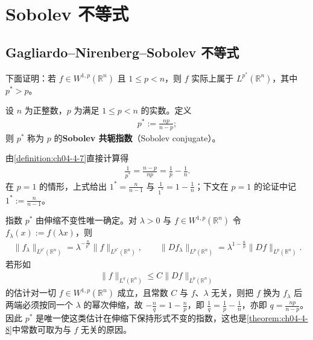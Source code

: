 \documentclass[../../main.tex]{subfiles}%
\begin{document}
\section{Sobolev 不等式}\label{section:ch04-05}

\subsection{Gagliardo--Nirenberg--Sobolev 不等式}\label{subsection:ch04-05-1}

下面证明：若 $f\in W^{1,p}(\mathbb{R}^n)$ 且 $1\leqslant p<n$，则 $f$ 实际上属于 $L^{p^*}(\mathbb{R}^n)$，其中 $p^*>p$。

\begin{definition}\label{definition:ch04-4-7}
设 $n$ 为正整数，$p$ 为满足 $1\leqslant p<n$ 的实数。定义
\begin{align*}
p^*:=\frac{np}{n-p};
\end{align*}
则 $p^*$ 称为 $p$ 的\textbf{Sobolev 共轭指数}（Sobolev conjugate）。
\end{definition}

\begin{remark}\label{remark:ch04-def-4-7-倒数}
由\cref{definition:ch04-4-7}直接计算得%
\begin{align*}
\frac{1}{p^*}=\frac{n-p}{np}=\frac{1}{p}-\frac{1}{n}.
\end{align*}
在 $p=1$ 的情形，上式给出 $1^*=\frac{n}{n-1}$ 与 $\frac{1}{1^*}=1-\frac{1}{n}$；下文在 $p=1$ 的论证中记 $1^*:=\frac{n}{n-1}$。
\end{remark}

\begin{remark}\label{remark:ch04-def-4-7-动机}
指数 $p^*$ 由伸缩不变性唯一确定。对 $\lambda>0$ 与 $f\in W^{1,p}(\mathbb{R}^n)$ 令 $f_\lambda(x):=f(\lambda x)$，则
\begin{align*}
\lVert f_\lambda\rVert_{L^{p^*}(\mathbb{R}^n)}=\lambda^{-\frac{n}{p^*}}\lVert f\rVert_{L^{p^*}(\mathbb{R}^n)},\qquad
\lVert Df_\lambda\rVert_{L^p(\mathbb{R}^n)}=\lambda^{1-\frac{n}{p}}\lVert Df\rVert_{L^p(\mathbb{R}^n)} .
\end{align*}
若形如
\begin{align*}
\lVert f\rVert_{L^{q}(\mathbb{R}^n)}\leqslant C\lVert Df\rVert_{L^p(\mathbb{R}^n)}
\end{align*}
的估计对一切 $f\in W^{1,p}(\mathbb{R}^n)$ 成立，且常数 $C$ 与 $f$、$\lambda$ 无关，则把 $f$ 换为 $f_\lambda$ 后两端必须按同一个 $\lambda$ 的幂次伸缩，故 $-\frac{n}{q}=1-\frac{n}{p}$，即 $\frac{1}{q}=\frac{1}{p}-\frac{1}{n}$，亦即 $q=\frac{np}{n-p}$。因此 $p^*$ 是唯一使这类估计在伸缩下保持形式不变的指数，这也是\cref{theorem:ch04-4-8}中常数可取为与 $f$ 无关的原因。%
\end{remark}
\end{document}

